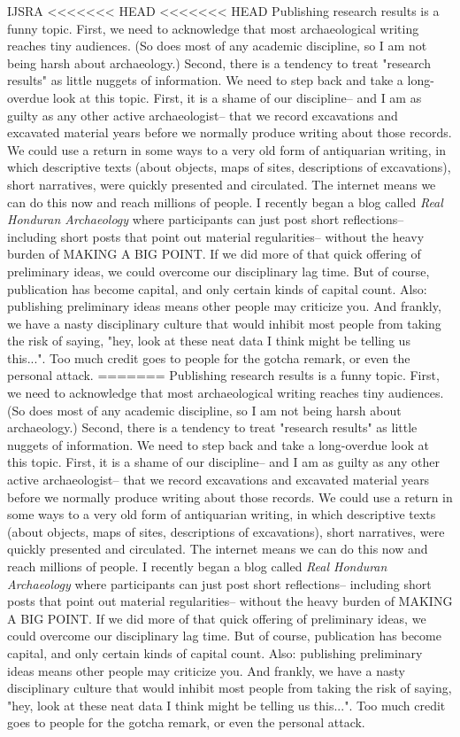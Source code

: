 \begin{labeling}{IJSRA}
<<<<<<< HEAD
<<<<<<< HEAD
Publishing research results is a funny topic. First, we need to acknowledge that most archaeological writing reaches tiny audiences. (So does most of any academic discipline, so I am not being harsh about archaeology.) Second, there is a tendency to treat "research results" as little nuggets of information. We need to step back and take a long-overdue look at this topic. First, it is a shame of our discipline-- and I am as guilty as any other active archaeologist-- that we record excavations and excavated material years before we normally produce writing about those records. We could use a return in some ways to a very old form of antiquarian writing, in which descriptive texts (about objects, maps of sites, descriptions of excavations), short narratives, were quickly presented and circulated. The internet means we can do this now and reach millions of people. I recently began a blog called \emph{Real Honduran Archaeology} where participants can just post short reflections-- including short posts that point out material regularities-- without the heavy burden of MAKING A BIG POINT. If we did more of that quick offering of preliminary ideas, we could overcome our disciplinary lag time. But of course, publication has become capital, and only certain kinds of capital count. Also: publishing preliminary ideas means other people may criticize you. And frankly, we have a nasty disciplinary culture that would inhibit most people from taking the risk of saying, "hey, look at these neat data I think might be telling us this...". Too much credit goes to people for the gotcha remark, or even the personal attack. 
=======
Publishing research results is a funny topic. First, we need to acknowledge that most archaeological writing reaches tiny audiences. (So does most of any academic discipline, so I am not being harsh about archaeology.) Second, there is a tendency to treat "research results" as little nuggets of information. We need to step back and take a long-overdue look at this topic. First, it is a shame of our discipline-- and I am as guilty as any other active archaeologist-- that we record excavations and excavated material years before we normally produce writing about those records. We could use a return in some ways to a very old form of antiquarian writing, in which descriptive texts (about objects, maps of sites, descriptions of excavations), short narratives, were quickly presented and circulated. The internet means we can do this now and reach millions of people. I recently began a blog called \textit{Real Honduran Archaeology} where participants can just post short reflections-- including short posts that point out material regularities-- without the heavy burden of {\scshape MAKING A BIG POINT}. If we did more of that quick offering of preliminary ideas, we could overcome our disciplinary lag time. But of course, publication has become capital, and only certain kinds of capital count. Also: publishing preliminary ideas means other people may criticize you. And frankly, we have a nasty disciplinary culture that would inhibit most people from taking the risk of saying, "hey, look at these neat data I think might be telling us this...". Too much credit goes to people for the gotcha remark, or even the personal attack. 

\end{labeling}

